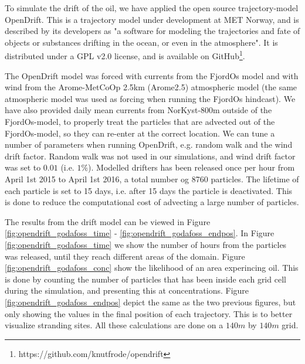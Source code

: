 To simulate the drift of the oil, we have applied the open source trajectory-model OpenDrift. This is a trajectory model under development at MET Norway, and is described by its developers as "a software for modeling the trajectories and fate of objects or substances drifting in the ocean, or even in the atmosphere". It is distributed under a GPL v2.0 license, and is available on GitHub\footnote{https://github.com/knutfrode/opendrift}.

The OpenDrift model was forced with currents from the FjordOs model and with wind from the Arome-MetCoOp 2.5km (Arome2.5) atmospheric model (the same atmospheric model was used as forcing when running the FjordOs hindcast). We have also provided daily mean currents from NorKyst-800m outside of the FjordOs-model, to properly treat the particles that are advected out of the FjordOs-model, so they can re-enter at the correct location. We can tune a number of parameters when running OpenDrift, e.g. random walk and the wind drift factor. Random walk was not used in our simulations, and wind drift factor was set to $0.01$ (i.e. $1\%$). Modelled drifters has been released once per hour from April 1st 2015 to April 1st 2016, a total number og 8760 particles. The lifetime of each particle is set to 15 days, i.e. after 15 days the particle is deactivated. This is done to reduce the computational cost of advecting a large number of particles. 

The results from the drift model can be viewed in Figure \ref{fig:opendrift_godafoss_time} - \ref{fig:opendrift_godafoss_endpos}. In Figure \ref{fig:opendrift_godafoss_time} we show the number of hours from the particles was released, until they reach different areas of the domain. Figure \ref{fig:opendrift_godafoss_conc} show the likelihood of an area experincing oil. This is done by counting the number of particles that has been inside each grid cell during the simulation, and presenting this at concentrations. Figure \ref{fig:opendrift_godafoss_endpos} depict the same as the two previous figures, but only showing the values in the final position of each trajectory. This is to better visualize stranding sites. All these calculations are done on a $140m$ by $140m$ grid.

